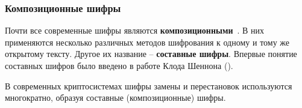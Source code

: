 \subsubsection{Композиционные шифры}

Почти все современные шифры являются \textbf{композиционными}~\cite{AlZKCh:2001}. В них применяются несколько различных методов шифрования к одному и тому же открытому тексту. Другое их название -- \textbf{составные шифры}. Впервые понятие составных шифров было введено в работе Клода Шеннона ().

В современных криптосистемах шифры замены и перестановок используются многократно, образуя составные (композиционные) шифры.

